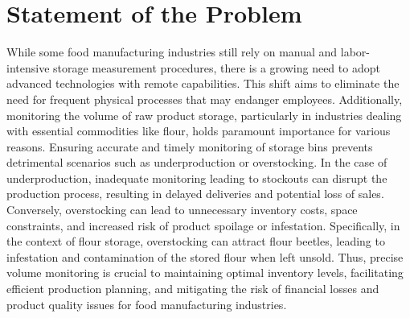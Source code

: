 \section{Statement of the Problem}
\label{intro:sec:Statement of the Problem}

While some food manufacturing industries still rely on manual and labor-intensive storage measurement procedures, there is a growing need to adopt advanced technologies with remote capabilities. This shift aims to eliminate the need for frequent physical processes that may endanger employees. Additionally, monitoring the volume of raw product storage, particularly in industries dealing with essential commodities like flour, holds paramount importance for various reasons. Ensuring accurate and timely monitoring of storage bins prevents detrimental scenarios such as underproduction or overstocking. In the case of underproduction, inadequate monitoring leading to stockouts can disrupt the production process, resulting in delayed deliveries and potential loss of sales. Conversely, overstocking can lead to unnecessary inventory costs, space constraints, and increased risk of product spoilage or infestation. Specifically, in the context of flour storage, overstocking can attract flour beetles, leading to infestation and contamination of the stored flour when left unsold. Thus, precise volume monitoring is crucial to maintaining optimal inventory levels, facilitating efficient production planning, and mitigating the risk of financial losses and product quality issues for food manufacturing industries.

